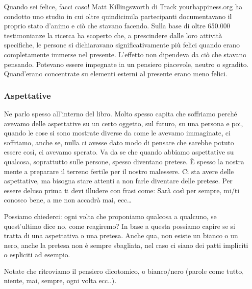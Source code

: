 \documentclass[12pt]{book} %
\begin{document}
Quando sei felice, facci caso!
Matt Killingsworth di Track yourhappiness.org ha condotto uno studio in cui oltre quindicimila partecipanti
documentavano il proprio stato d'animo e ciò che stavano facendo. Sulla base di oltre 650.000
testimonianze la ricerca ha scoperto che, a prescindere dalle loro attività specifiche, le persone si dichiaravano
significativamente più felici quando erano completamente immerse nel presente. L'effetto non
dipendeva da ciò che stavano pensando. Potevano essere impegnate in un pensiero piacevole, neutro o sgradito.
Quand'erano concentrate su elementi esterni al presente erano meno felici. 

\subsubsection{Aspettative}
Ne parlo spesso all'interno del libro. Molto spesso capita che soffriamo perché avevamo delle
aspettative su un certo oggetto, sul futuro, su una persona e poi, quando le cose si sono mostrate diverse da come le avevamo
immaginate, ci soffriamo, anche se, nulla ci avesse dato modo di pensare che sarebbe potuto essere così, ci avevamo
sperato. Va da se che quando abbiamo aspettative su qualcosa, soprattutto sulle persone, spesso diventano pretese. È spesso
la nostra mente a preparare il terreno fertile per il nostro malessere.
Ci sta avere delle aspettative, ma bisogna stare attenti a non farle diventare delle pretese. 
Per essere deluso prima ti devi illudere con frasi come: Sarà così per sempre, mi/ti conosco bene, a me non accadrà mai, ecc…

Possiamo chiederci: ogni volta che proponiamo qualcosa a qualcuno, se quest'ultimo dice no, come reagiremo? In base a
questa possiamo capire se si tratta di una aspettativa o una pretesa. Anche qua, non esiste un bianco o un nero, anche
la pretesa non è sempre sbagliata, nel caso ci siano dei patti impliciti o espliciti ad esempio.

Notate che ritroviamo il pensiero dicotomico, o bianco/nero (parole come tutto, niente, mai, sempre, ogni volta ecc..).
\end{document}
